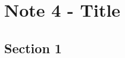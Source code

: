\documentclass[10pt]{article}
\author{}
\date{}
\begin{document}
\section*{\centering Note 4 - Title}

\subsection*{Section 1}
\end{document}
